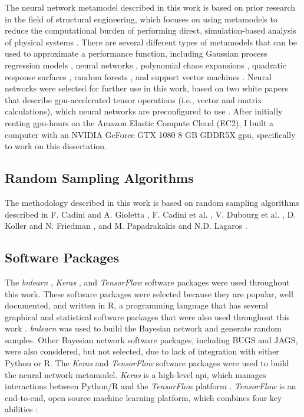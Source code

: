 The neural network metamodel described in this work is based on prior research in the field of structural engineering, which focuses on using metamodels to reduce the computational burden of performing direct, simulation-based analysis of physical systems \cite{cadini2015,dubourg,papadrakakis,raissi,zhang}.
There are several different types of metamodels that can be used to approximate a performance function, including Gaussian process regression models \cite{dubourg,quinonero,smola}, neural networks \cite{goodfellow,hinton}, polynomial chaos expansions \cite{blatman,crestaux,oladyshkin}, quadratic response surfaces \cite{ames,hartley}, random forests \cite{kuhn,liaw}, and support vector machines \cite{bennett,scholkopf,suykens}.
Neural networks were selected for further use in this work, based on two white papers \cite{tensorflow} that describe \gls{gpu}-accelerated tensor operations (i.e., vector and matrix calculations), which neural networks are preconfigured to use \cite{tensorflow,keras}.
After initially renting \gls{gpu}-hours on the Amazon Elastic Compute Cloud (EC2), I built a computer with an NVIDIA GeForce GTX 1080 8 GB GDDR5X \gls{gpu}, specifically to work on this dissertation.

\subsection{Random Sampling Algorithms}

The methodology described in this work is based on random sampling algorithms described in F. Cadini and A. Gioletta \cite{cadini2016}, F. Cadini et al. \cite{cadini2015}, V. Dubourg et al. \cite{dubourg}, D. Koller and N. Friedman \cite{koller}, and M. Papadrakakis and N.D. Lagaros \cite{papadrakakis}.

\subsection{Software Packages}

The \textit{bnlearn} \cite{bnlearn}, \textit{Keras} \cite{keras}, and \textit{TensorFlow} \cite{tensorflow} software packages were used throughout this work.
These software packages were selected because they are popular, well documented, and written in R, a programming language that has several graphical and statistical software packages that were also used throughout this work \cite{igraph,fitdistrplus,grain,caret,bnlearn,ggplot2}.
\textit{bnlearn} \cite{bnlearn} was used to build the Bayesian network and generate random samples.
Other Bayesian network software packages, including BUGS and JAGS, were also considered, but not selected, due to lack of integration with either Python or R.
The \textit{Keras} \cite{keras} and \textit{TensorFlow} \cite{tensorflow} software packages were used to build the neural network metamodel.
\textit{Keras} is a high-level \gls{api}, which manages interactions between Python/R and the \textit{TensorFlow} platform \cite{keras}.
\textit{TensorFlow} is an end-to-end, open source machine learning platform, which combines four key abilities \cite{tensorflow}:

